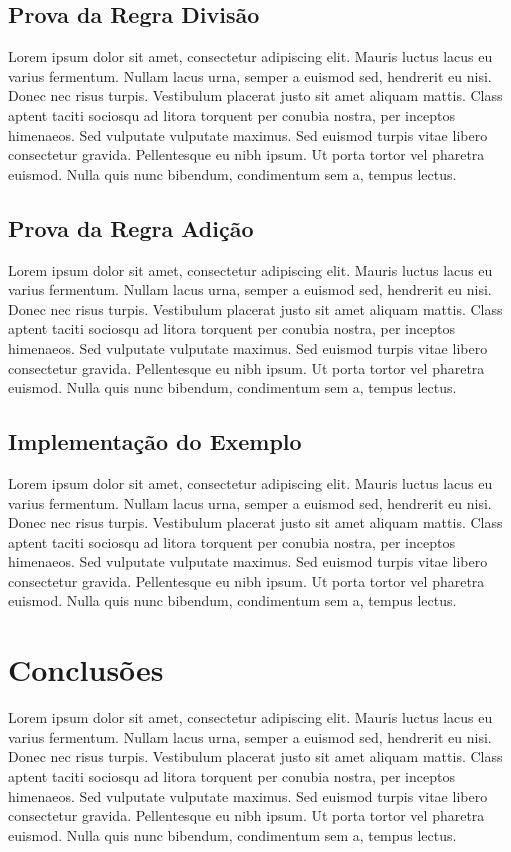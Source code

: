 \documentclass[conference]{IEEEtran}
\begin{document}
\subsection{Prova da Regra Divisão}
Lorem ipsum dolor sit amet, consectetur adipiscing elit. Mauris luctus lacus eu varius fermentum. Nullam lacus urna, semper a euismod sed, hendrerit eu nisi. Donec nec risus turpis. Vestibulum placerat justo sit amet aliquam mattis. Class aptent taciti sociosqu ad litora torquent per conubia nostra, per inceptos himenaeos. Sed vulputate vulputate maximus. Sed euismod turpis vitae libero consectetur gravida. Pellentesque eu nibh ipsum. Ut porta tortor vel pharetra euismod. Nulla quis nunc bibendum, condimentum sem a, tempus lectus.

\subsection{Prova da Regra Adição}
Lorem ipsum dolor sit amet, consectetur adipiscing elit. Mauris luctus lacus eu varius fermentum. Nullam lacus urna, semper a euismod sed, hendrerit eu nisi. Donec nec risus turpis. Vestibulum placerat justo sit amet aliquam mattis. Class aptent taciti sociosqu ad litora torquent per conubia nostra, per inceptos himenaeos. Sed vulputate vulputate maximus. Sed euismod turpis vitae libero consectetur gravida. Pellentesque eu nibh ipsum. Ut porta tortor vel pharetra euismod. Nulla quis nunc bibendum, condimentum sem a, tempus lectus.

\subsection{Implementação do Exemplo}
Lorem ipsum dolor sit amet, consectetur adipiscing elit. Mauris luctus lacus eu varius fermentum. Nullam lacus urna, semper a euismod sed, hendrerit eu nisi. Donec nec risus turpis. Vestibulum placerat justo sit amet aliquam mattis. Class aptent taciti sociosqu ad litora torquent per conubia nostra, per inceptos himenaeos. Sed vulputate vulputate maximus. Sed euismod turpis vitae libero consectetur gravida. Pellentesque eu nibh ipsum. Ut porta tortor vel pharetra euismod. Nulla quis nunc bibendum, condimentum sem a, tempus lectus.

\section*{Conclusões}
Lorem ipsum dolor sit amet, consectetur adipiscing elit. Mauris luctus lacus eu varius fermentum. Nullam lacus urna, semper a euismod sed, hendrerit eu nisi. Donec nec risus turpis. Vestibulum placerat justo sit amet aliquam mattis. Class aptent taciti sociosqu ad litora torquent per conubia nostra, per inceptos himenaeos. Sed vulputate vulputate maximus. Sed euismod turpis vitae libero consectetur gravida. Pellentesque eu nibh ipsum. Ut porta tortor vel pharetra euismod. Nulla quis nunc bibendum, condimentum sem a, tempus lectus.
\end{document}
